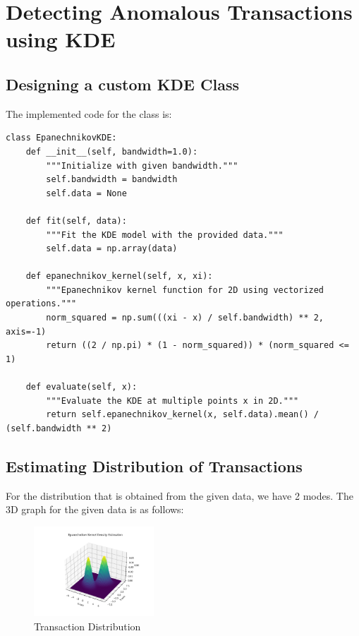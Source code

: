 \chapter{Detecting Anomalous Transactions using KDE}

\section{Designing a custom KDE Class}

The implemented code for the class is:

\begin{lstlisting}[caption={2D Epanechnikov KDE class}]
class EpanechnikovKDE:
    def __init__(self, bandwidth=1.0):
        """Initialize with given bandwidth."""
        self.bandwidth = bandwidth
        self.data = None

    def fit(self, data):
        """Fit the KDE model with the provided data."""
        self.data = np.array(data)

    def epanechnikov_kernel(self, x, xi):
        """Epanechnikov kernel function for 2D using vectorized operations."""
        norm_squared = np.sum(((xi - x) / self.bandwidth) ** 2, axis=-1)
        return ((2 / np.pi) * (1 - norm_squared)) * (norm_squared <= 1)

    def evaluate(self, x):
        """Evaluate the KDE at multiple points x in 2D."""
        return self.epanechnikov_kernel(x, self.data).mean() / (self.bandwidth ** 2)
\end{lstlisting}

\section{Estimating Distribution of Transactions}
For the distribution that is obtained from the given data, we have 2 modes.
The 3D graph for the given data is as follows:

\begin{figure}[H]
  \centering
  \includegraphics[width=0.4\textwidth]
  {assets/images/transaction_distribution.png}
  \caption{Transaction Distribution}
\end{figure}